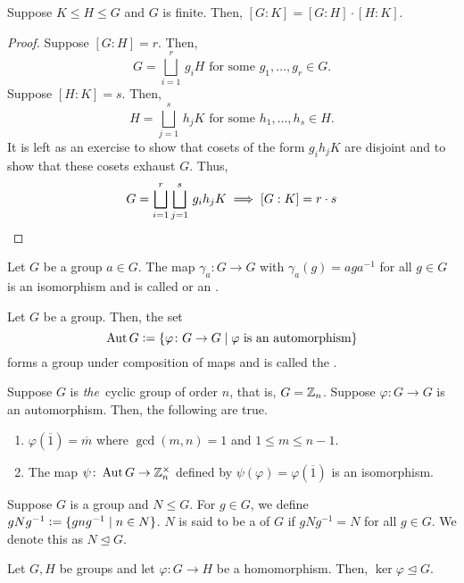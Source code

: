 \begin{theorem} \label{thm:product-of-indices}
    Suppose $K \leq H \leq G$ and $G$ is finite. Then, $[G:K] = [G:H] \cdot [H:K]$.
\end{theorem}
\begin{proof}
    Suppose $[G:H] = r$. Then, 
    \[
        G = \bigsqcup_{i=1}^r \, g_iH \text{  for some } g_1, \ldots, g_r \in G.
    \]
    Suppose $[H:K] = s$. Then,
    \[
        H = \bigsqcup_{j=1}^s \, h_jK \text{  for some } h_1, \ldots, h_s \in H.
    \]
    It is left as an exercise to show that cosets of the form $g_ih_jK$ are disjoint and to show that these cosets exhaust $G$. Thus, 
    \[
        G = \bigsqcup_{i=1}^r \bigsqcup_{j=1}^s \, g_ih_jK \implies [G:K] = r\cdot s \qedhere
    \]
\end{proof}

\begin{defn}
    Let $G$ be a group $a \in G$. The map $\gamma_a \colon G \to G$ with $\gamma_a(g) = aga^{-1}$ for all $g \in G$ is an isomorphism and is called  or an .
\end{defn}
\begin{defn}
    Let $G$ be a group. Then, the set
    \[
        \operatorname{Aut} G \vcentcolon= \left\{ \varphi \colon G \to G \mid \varphi \text{ is an automorphism} \right\}
    \]
    forms a group under composition of maps and is called the .
\end{defn}
\begin{prop}
    Suppose $G$ is \emph{the}\footnotemark\ cyclic group of order $n$, that is, $G = \mathbb{Z}_n$. Suppose $\varphi \colon G \to G$ is an automorphism. Then, the following are true.
    \begin{enumerate}
        \item $\varphi(\overline{1}) = \overline{m}$ where $\gcd(m,n) = 1$ and $1 \leq m \leq n-1$.
        \item The map $\psi \colon \operatorname{Aut} G \to \mathbb{Z}_n^{\times}$ defined by $\psi(\varphi) = \varphi(\overline{1})$ is an isomorphism.
    \end{enumerate}
\end{prop}

\begin{defn}
    Suppose $G$ is a group and $N \leq G$. For $g \in G$, we define $gNg^{-1} \vcentcolon= \{gng^{-1} \mid n \in N\}$. $N$ is said to be a  of $G$ if $gNg^{-1} = N$ for all $g \in G$. We denote this as $N \trianglelefteq G$.
\end{defn}
\begin{prop} \label{prop:kernel-is-normal}
    Let $G,H$ be groups and let $\varphi \colon G \to H$ be a homomorphism. Then, $\ker\varphi \trianglelefteq G$.
\end{prop}

